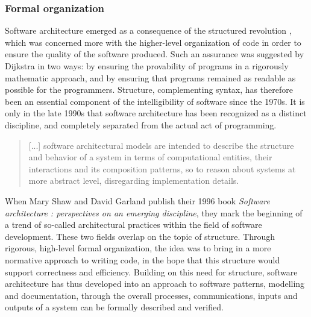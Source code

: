\subsubsection{Formal organization}
\label{subsubsec:formal-organization}

Software architecture emerged as a consequence of the structured revolution \citep{dijkstra_chapter_1972}, which was concerned more with the higher-level organization of code in order to ensure the quality of the software produced. Such an assurance was suggested by Dijkstra in two ways: by ensuring the provability of programs in a rigorously mathematic approach, and by ensuring that programs remained as readable as possible for the programmers. Structure, complementing syntax, has therefore been an essential component of the intelligibility of software since the 1970s. It is only in the late 1990s that software architecture has been recognized as a distinct discipline, and completely separated from the actual act of programming.

\begin{quote}
  [...] software architectural models are intended to describe the structure and behavior of a system in terms of computational entities, their interactions and its composition patterns, so to reason about systems at more abstract  level, disregarding implementation details. \citep{garland_software_2000}
\end{quote}

When Mary Shaw and David Garland publish their 1996 book \emph{Software architecture : perspectives on an emerging discipline}, they mark the beginning of a trend of so-called architectural practices within the field of software development. These two fields overlap on the topic of structure. Through rigorous, high-level formal organization, the idea was to bring in a more normative approach to writing code, in the hope that this structure would support correctness and efficiency. Building on this need for structure, software architecture has thus developed into an approach to software patterns, modelling and documentation, through the overall processes, communications, inputs and outputs of a system can be formally described and verified.

